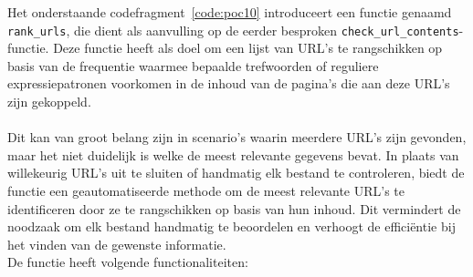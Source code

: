 Het onderstaande codefragment~\ref{code:poc10} introduceert een functie genaamd \texttt{rank\_urls}, die dient als aanvulling op de eerder besproken \texttt{check\_url\_contents}-functie. Deze functie heeft als doel om een lijst van URL's te rangschikken op basis van de frequentie waarmee bepaalde trefwoorden of reguliere expressiepatronen voorkomen in de inhoud van de pagina's die aan deze URL's zijn gekoppeld.
\\ \\
Dit kan van groot belang zijn in scenario's waarin meerdere URL's zijn gevonden, maar het niet duidelijk is welke de meest relevante gegevens bevat. In plaats van willekeurig URL's uit te sluiten of handmatig elk bestand te controleren, biedt de functie een geautomatiseerde methode om de meest relevante URL's te identificeren door ze te rangschikken op basis van hun inhoud. Dit vermindert de noodzaak om elk bestand handmatig te beoordelen en verhoogt de efficiëntie bij het vinden van de gewenste informatie.
\\
De functie heeft volgende functionaliteiten:
